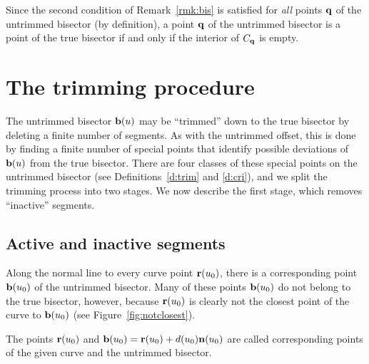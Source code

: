 Since the second condition of Remark~\ref{rmk:bis} is satisfied for
{\it all\/} points ${\bf q}$ of the untrimmed bisector (by definition),
a point ${\bf q}$ of the untrimmed bisector is a point of the true
bisector if and only if the interior of $C_{\bf q}$ is empty.

\section{The trimming procedure}
\label{trimming}

The untrimmed bisector ${\bf b}(u)$ may be ``trimmed'' down to the true
bisector by deleting a finite number of segments. As with the untrimmed
offset, this is done by finding a finite number of special points that
identify possible deviations of ${\bf b}(u)$ from the true bisector.
There are four classes of these special points on the untrimmed bisector
(see Definitions~\ref{d:trim} and \ref{d:cri}), and we split the trimming
process into two stages. We now describe the first stage, which removes
``inactive'' segments.

\subsection{Active and inactive segments}

Along the normal line to every curve point ${\bf r}(u_0)$, there is a
corresponding point ${\bf b}(u_0)$ of the untrimmed bisector. Many of
these points ${\bf b}(u_0)$ do not belong to the true bisector, however,
because ${\bf r}(u_0)$ is clearly not the closest point of the curve to
${\bf b}(u_0)$ (see Figure~\ref{fig:notclosest}).


\begin{dfn}
The points ${\bf r}(u_0)$ and ${\bf b}(u_0)={\bf r}(u_0)+d(u_0){\bf n}
(u_0)$ are called {\rm corresponding points} of the given curve and the
untrimmed bisector.
\end{dfn}

